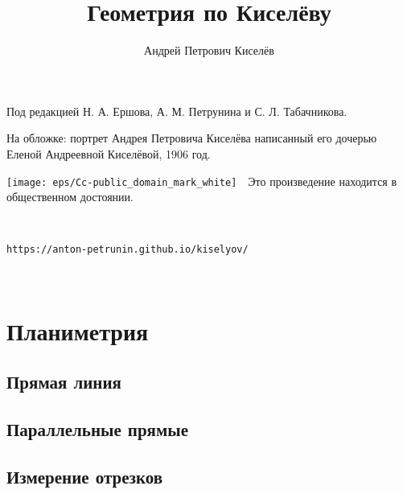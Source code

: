 \documentclass[twoside]{book}
\begin{document}


\cleardoublepage
\frontmatter
\title{Геометрия по Киселёву}
\author{Андрей Петрович Киселёв}
\date{}
\maketitle

\thispagestyle{empty}

Под редакцией Н. А. Ершова, А. М. Петрунина и С. Л. Табачникова.

На обложке: портрет  Андрея Петровича Киселёва написанный его дочерью Еленой Андреевной Киселёвой, 1906 год.

\vfill

\noindent
\texttt{[image: eps/Cc-public\_domain\_mark\_white]}\ \ 
Это произведение находится в общественном достоянии.

\ 

\noindent\texttt{https://anton-petrunin.github.io/kiselyov/} 

\ 


\mainmatter




\cleardoublepage
\part{Планиметрия}

\chapter{Прямая линия}





\chapter{Параллельные прямые}










\chapter{Измерение отрезков}


\end{document}
